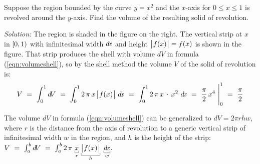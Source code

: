\begin{exmp}
\noindent Suppose the region bounded by the curve $y=x^2$ and the $x$-axis
for $0 \le x \le 1$ is revolved around the $y$-axis. Find the
volume of the resulting solid of revolution.\vspace{0.5mm}
\par\noindent\emph{Solution:} The region is shaded in the figure on the right.
The vertical strip at $x$ in $\lbrack 0,1 )$ with infinitesimal width $d\!x$ and
height $\bigl\lvert\mspace{1mu}f(x)\mspace{1mu}\bigr\rvert=f(x)$ is shown in the figure. That strip produces the shell
with volume $d\!V$ in formula (\ref{eqn:volumeshell}), so by the shell method
the volume $V$ of the solid of revolution is:
\[
V ~=~ \int_0^1 d\!V ~=~ \int_0^1 2\,\pi\,x\,\bigl\lvert\mspace{1mu}f(x)\mspace{1mu}\bigr\rvert~d\!x ~=~
\int_0^1 2\,\pi\,x\,\cdot\,x^2~d\!x ~=~ \frac{\pi}{2}\,x^4~\Biggr|_0^1 ~=~
\frac{\pi}{2}
\]
\end{exmp}
\divider
\newpage
The volume $d\!V$ in formula (\ref{eqn:volumeshell}) can be generalized to
$d\!V = 2 \pi r h w$, where $r$ is the distance from the axis of
revolution to a generic vertical strip of infinitesimal width $w$ in the region,
and $h$ is the height of the strip: $V ~=~ \int_a^b d\!V ~=~ \int_a^b
2\,\pi\,\underbracket[0.3pt]{x}_{r}\,\underbracket[0.3pt]{\Abs{f(x)}}_{h}~\underbracket[0.3pt]{\dx}_{w}$.
\vspace{-0.8em}
